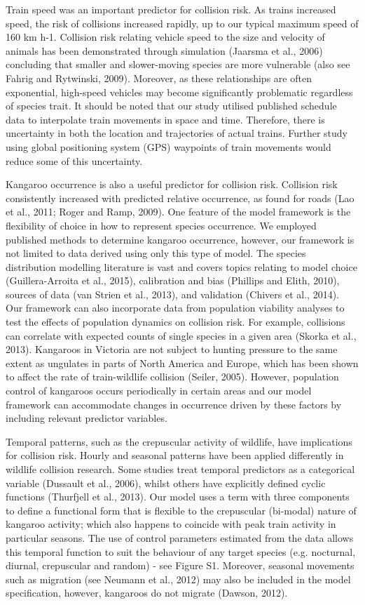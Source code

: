 Train speed was an important predictor for collision risk.  As trains increased speed, the risk of collisions increased rapidly, up to our typical maximum speed of 160 km h-1.  Collision risk relating vehicle speed to the size and velocity of animals has been demonstrated through simulation (Jaarsma et al., 2006) concluding that smaller and slower-moving species are more vulnerable (also see Fahrig and Rytwinski, 2009). Moreover, as these relationships are often exponential, high-speed vehicles may become significantly problematic regardless of species trait. It should be noted that our study utilised published schedule data to interpolate train movements in space and time. Therefore, there is uncertainty in both the location and trajectories of actual trains. Further study using global positioning system (GPS) waypoints of train movements would reduce some of this uncertainty.

Kangaroo occurrence is also a useful predictor for collision risk. Collision risk consistently increased with predicted relative occurrence, as found for roads (Lao et al., 2011; Roger and Ramp, 2009).  One feature of the model framework is the flexibility of choice in how to represent species occurrence.  We employed published methods to determine kangaroo occurrence, however, our framework is not limited to data derived using only this type of model.  The species distribution modelling literature is vast and covers topics relating to model choice (Guillera-Arroita et al., 2015), calibration and bias (Phillips and Elith, 2010), sources of data (van Strien et al., 2013), and validation (Chivers et al., 2014).  Our framework can also incorporate data from population viability analyses to test the effects of population dynamics on collision risk. For example, collisions can correlate with expected counts of single species in a given area (Skorka et al., 2013).  Kangaroos in Victoria are not subject to hunting pressure to the same extent as ungulates in parts of North America and Europe, which has been shown to affect the rate of train-wildlife collision (Seiler, 2005).  However, population control of kangaroos occurs periodically in certain areas and our model framework can accommodate changes in occurrence driven by these factors by including relevant predictor variables. 

Temporal patterns, such as the crepuscular activity of wildlife, have implications for collision risk. Hourly and seasonal patterns have been applied differently in wildlife collision research.  Some studies treat temporal predictors as a categorical variable (Dussault et al., 2006), whilst others have explicitly defined cyclic functions (Thurfjell et al., 2013).  Our model uses a term with three components to define a functional form that is flexible to the crepuscular (bi-modal) nature of kangaroo activity; which also happens to coincide with peak train activity in particular seasons. The use of control parameters estimated from the data allows this temporal function to suit the behaviour of any target species (e.g. nocturnal, diurnal, crepuscular and random) - see Figure S1.  Moreover, seasonal movements such as migration (see Neumann et al., 2012) may also be included in the model specification, however, kangaroos do not migrate (Dawson, 2012).

